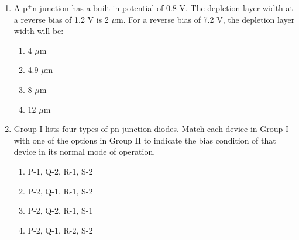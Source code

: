 \documentclass[journal,12pt,onecolumn]{IEEEtran}
\theoremstyle{remark}
\begin{document}
\begin{enumerate}
\hfill{}
\begin{multicols}{4}

\begin{enumerate}
    \item 0
    \item $5\angle 20^\circ$
    \item $12.5\angle 30^\circ$
    \item $17\angle 30^\circ$
\end{enumerate}
\end{multicols}

\item A p$^+$n junction has a built-in potential of 0.8 V. The depletion layer width at a reverse bias of 1.2 V is 2 $\mu$m. For a reverse bias of 7.2 V, the depletion layer width will be:
\hfill{}
\begin{multicols}{4}
\begin{enumerate}
    \item 4 $\mu$m
    \item 4.9 $\mu$m
    \item 8 $\mu$m
    \item 12 $\mu$m
\end{enumerate}
\end{multicols}

\item Group I lists four types of pn junction diodes. Match each device in Group I with one of the options in Group II to indicate the bias condition of that device in its normal mode of operation. 


\hfill{}
\begin{enumerate}
    \item P-1, Q-2, R-1, S-2
    \item P-2, Q-1, R-1, S-2
    \item P-2, Q-2, R-1, S-1
    \item P-2, Q-1, R-2, S-2
\end{enumerate}


\end{enumerate}
\end{document}
